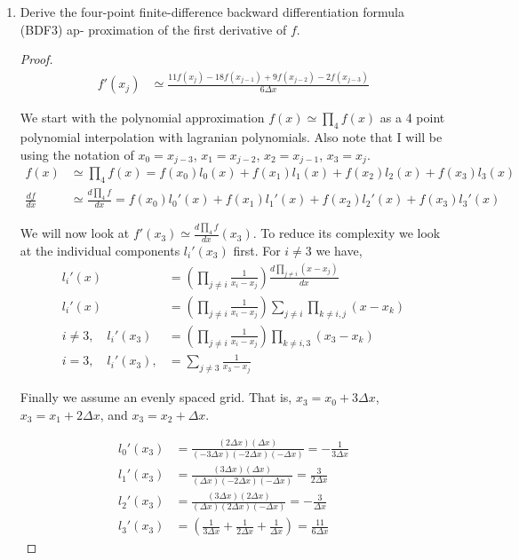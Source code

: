 \documentclass{article}
\begin{document}
\begin{enumerate}[label=\alph*)]


    \item Derive the four-point finite-difference backward differentiation formula (BDF3) ap-
proximation of the first derivative of $f$. 
    \begin{proof}
        \begin{align}
            f'(x_j) &\simeq \frac{11f(x_j) - 18f(x_{j-1}) + 9f(x_{j-2}) - 2f(x_{j-3})}{6\Delta x}
        \end{align}

    We start with the polynomial approximation $f(x) \simeq \prod_4f(x)$ as a 4 point polynomial interpolation with lagranian polynomials. Also note that I will be using the notation of $x_0 = x_{j-3}$, $ x_1 = x_{j-2}$, $x_2 = x_{j-1}$, $x_3 = x_j$. 
        \begin{align}
            f(x) &\simeq \prod_4f(x) = f(x_0) l_0(x) + f(x_1) l_1(x) + f(x_2) l_2(x) + f(x_3)l_3(x) \\
            \frac{df}{dx} &\simeq \frac{d\prod_4f}{dx} = f(x_0) l_0'(x) + f(x_1) l_1'(x) + f(x_2) l_2'(x) + f(x_3)l_3'(x)
        \end{align}

        We will now look at $f'(x_3) \simeq \frac{d\prod_4f}{dx}(x_3)$. To reduce its complexity we look at the individual components $l_i'(x_3)$ first. For $i \neq 3$ we have, 
        \begin{align}
            l_i'(x) &= \left(\prod_{j \neq i}\frac{1}{x_i - x_j}\right)\frac{d \prod_{j \neq i}(x - x_j)}{dx} \\
            l_i'(x) &= \left(\prod_{j \neq i}\frac{1}{x_i - x_j}\right) \sum_{j\neq i}\prod_{k \neq i, j} (x - x_k) \\
            i \neq 3, \quad l_i'(x_3) &= \left(\prod_{j \neq i}\frac{1}{x_i - x_j}\right) \prod_{k \neq i, 3} (x_3 - x_k) \\
            i = 3, \quad l_i'(x_3),  &= \sum_{j \neq 3} \frac{1}{x_3 - x_j}
        \end{align}

        Finally we assume an evenly spaced grid. That is, $x_3 = x_0 + 3\Delta x$, $x_3 = x_1 + 2\Delta x$, and $x_3 = x_2 + \Delta x$. 

        \begin{align}
            l_0'(x_3) &= \frac{(2\Delta x)(\Delta x)}{(-3\Delta x)(-2\Delta x)(-\Delta x)} = -\frac{1}{3\Delta x} \\
            l_1'(x_3) &= \frac{(3\Delta x)(\Delta x)}{(\Delta x)(-2\Delta x)(-\Delta x)} = \frac{3}{2\Delta x}\\
            l_2'(x_3) &= \frac{(3\Delta x)(2\Delta x)}{(\Delta x)(2\Delta x)(-\Delta x)} = -\frac{3}{\Delta x}\\
            l_3'(x_3) &= \left(\frac{1}{3\Delta x} + \frac{1}{2\Delta x} + \frac{1}{\Delta x}\right) = \frac{11}{6\Delta x}
        \end{align}


\end{proof}
\end{enumerate}
\end{document}
